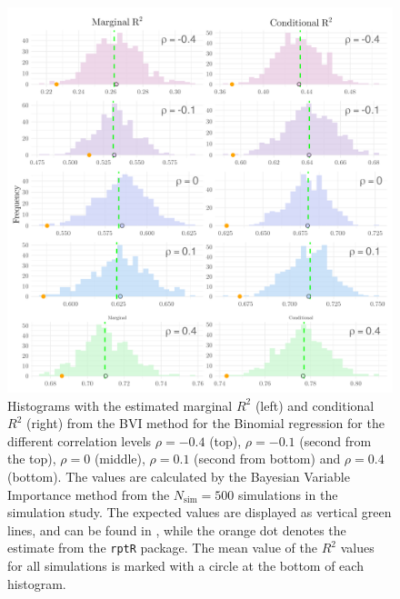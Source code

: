 \begin{figure}[H]
  \centering
  \includegraphics[width=1.1\linewidth]{Figures/Simulation study/R2_combined_logit.png}
  \caption[Marginal and conditional $R^2$ in Binomial GLMM]{Histograms with the estimated marginal $R^2$ (left) and conditional $R^2$ (right) from the BVI method for the Binomial regression for the different correlation levels $\rho=-0.4$ (top), $\rho=-0.1$ (second from the top), $\rho=0$ (middle), $\rho=0.1$ (second from bottom) and $\rho=0.4$ (bottom). The values are calculated by the Bayesian Variable Importance method from the $N_{\text{sim}}=500$ simulations in the simulation study. The expected values are displayed as vertical green lines, and can be found in , while the orange dot denotes the estimate from the \texttt{rptR} package. The mean value of the $R^2$ values for all simulations is marked with a circle at the bottom of each histogram.}
  \label{fig:r2_combined_logit}
\end{figure}






